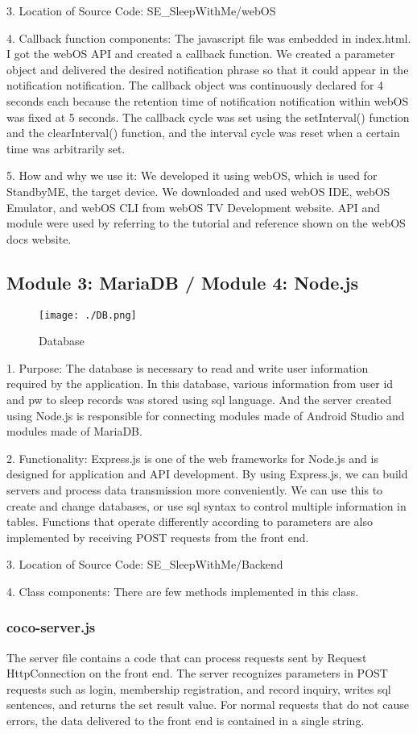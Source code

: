 \documentclass[conference]{IEEEtran}
\begin{document}
\par3. Location of Source Code: SE\_SleepWithMe/webOS\break

\par4. Callback function components: The javascript file was embedded in index.html. I got the webOS API and created a callback function. We created a parameter object and delivered the desired notification phrase so that it could appear in the notification notification. The callback object was continuously declared for 4 seconds each because the retention time of notification notification within webOS was fixed at 5 seconds. The callback cycle was set using the setInterval() function and the clearInterval() function, and the interval cycle was reset when a certain time was arbitrarily set.\break

\par5. How and why we use it: We developed it using webOS, which is used for StandbyME, the target device. We downloaded and used webOS IDE, webOS Emulator, and webOS CLI from webOS TV Development website. API and module were used by referring to the tutorial and reference shown on the webOS docs website.
\subsection{Module 3: MariaDB / Module 4: Node.js}
\begin{figure}[H]
\texttt{[image: ./DB.png]}
\centering
\caption{Database}
\end{figure}
1. Purpose: The database is necessary to read and write user information required by the application. In this database, various information from user id and pw to sleep records was stored using sql language. And the server created using Node.js is responsible for connecting modules made of Android Studio and modules made of MariaDB.\break
\par 2. Functionality: Express.js is one of the web frameworks for Node.js and is designed for application and API development. By using Express.js, we can build servers and process data transmission more conveniently. We can use this to create and change databases, or use sql syntax to control multiple information in tables. Functions that operate differently according to parameters are also implemented by receiving POST requests from the front end.\break
\par 3. Location of Source Code: SE\_SleepWithMe/Backend \break

\par 4. Class components: There are few methods implemented in this class.
\subsubsection{coco-server.js}
The server file contains a code that can process requests sent by Request HttpConnection on the front end. The server recognizes parameters in POST requests such as login, membership registration, and record inquiry, writes sql sentences, and returns the set result value. For normal requests that do not cause errors, the data delivered to the front end is contained in a single string.\break
\end{document}
